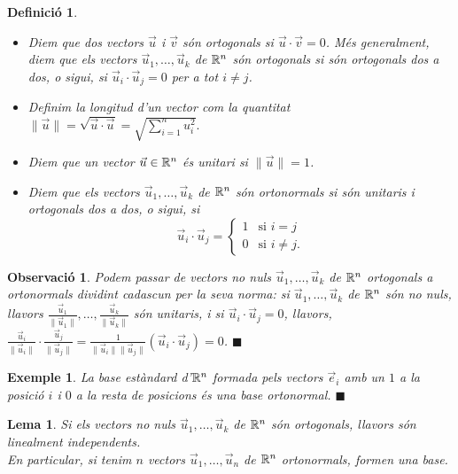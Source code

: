 \documentclass[
  11pt,
]{book}
\numberwithin{dummy}{section}
\theoremstyle{maincolornumbox}
\newtheorem{remarkT}{Observació}[chapter]
\theoremstyle{blacknumex}
\newtheorem{exampleT}{Exemple}[chapter]
\theoremstyle{blacknumbox}
\newtheorem{definitionT}{Definició}[chapter]
\theoremstyle{maincolornum}
\newtheorem{lemmaT}{Lema}[chapter]
\newenvironment{lemma}{\begin{pBox}\begin{lemmaT}}{\end{lemmaT}\end{pBox}}
\newenvironment{definition}{\begin{dBox}\begin{definitionT}}{\end{definitionT}\end{dBox}}
\newenvironment{example}{\begin{exampleT}}{\hfill{\tiny\ensuremath{\blacksquare}}\end{exampleT}}
\newenvironment{remark}{\begin{remarkT}}{\hfill{\tiny\ensuremath{\blacksquare}}\end{remarkT}}
\begin{document}
\begin{definition}
\leavevmode

\begin{itemize}
\item
  Diem que dos vectors \(\vec u\) i \(\vec v\) són \emph{ortogonals} si
  \(\vec u\cdot\vec v=0\). Més generalment, diem que els vectors
  \(\vec u_1, \dots, \vec u_k\) de \(\mathbb{R}^n\) \emph{són ortogonals} si són
  ortogonals dos a dos, o sigui, si \(\vec u_i\cdot\vec u_j=0\) per a
  tot \(i\neq j\).
\item
  Definim la \emph{longitud d'un vector} com la quantitat
  \(\|\vec u\|=\sqrt{\vec u\cdot \vec u}=\sqrt{\displaystyle\sum_{i=1}^n u_i^2}.\)
\item
  Diem que un vector \(\vec u\in\mathbb{R}^n\) és \emph{unitari} si \(\|\vec u\|=1\).
\item
  Diem que els vectors \(\vec u_1, \dots, \vec u_k\) de \(\mathbb{R}^n\) \emph{són
  ortonormals} si són unitaris i ortogonals dos a dos, o sigui, si
  \[\vec u_i\cdot\vec u_j=
      \begin{cases}
       1 & \text{si $i=j$} \\
       0 & \text{si $i\neq j.$}
      \end{cases}\]
\end{itemize}

\end{definition}

\begin{remark}
Podem passar de vectors no nuls \(\vec u_1, \dots, \vec u_k\) de \(\mathbb{R}^n\)
ortogonals a ortonormals dividint cadascun per la seva norma: si
\(\vec u_1, \dots, \vec u_k\) de \(\mathbb{R}^n\) són no nuls, llavors
\(\frac{\vec u_1}{\|\vec u_1\|}, \dots, \frac{\vec u_k}{\|\vec u_k\|}\)
són unitaris, i si \(\vec u_i\cdot \vec u_j=0\), llavors,
\(\frac{\vec u_i}{\|\vec u_i\|}\cdot \frac{\vec u_j}{\|\vec u_j\|}=\frac{1}{\|\vec u_i\| \|\vec u_j\|}(\vec u_i\cdot \vec u_j)=0\).
\end{remark}

\begin{example}
La base estàndard d'\(\mathbb{R}^n\) formada pels vectors \(\vec e_i\) amb un \(1\) a
la posició \(i\) i \(0\) a la resta de posicions és una base ortonormal.
\end{example}

\begin{lemma}
Si els vectors no nuls \(\vec u_1, \dots, \vec u_k\) de \(\mathbb{R}^n\) són
ortogonals, llavors són linealment independents.\\
En particular, si tenim \(n\) vectors \(\vec u_1, \dots, \vec u_n\) de
\(\mathbb{R}^n\) ortonormals, formen una base.
\end{lemma}
\end{document}
